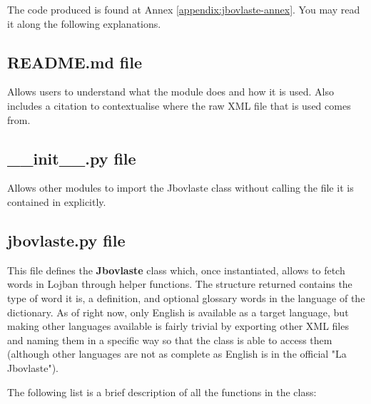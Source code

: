 The code produced is found at Annex \ref{appendix:jbovlaste-annex}. You may read it along the following explanations.

\subsection*{README.md file}

Allows users to understand what the module does and how it is used.
Also includes a citation to contextualise where the raw XML file that is used comes from.

\subsection*{\_\_init\_\_.py file}

Allows other modules to import the Jbovlaste class without calling the file it is contained in explicitly.

\subsection*{jbovlaste.py file}

This file defines the \textbf{Jbovlaste} class which, once instantiated, allows to fetch
words in Lojban through helper functions. The structure returned contains the type of word it is,
a definition, and optional glossary words in the language of the dictionary.
As of right now, only English is available as a target language, but making other
languages available is fairly trivial by exporting other XML files and naming them in a specific
way so that the class is able to access them (although other languages are not as complete as English
is in the official "La Jbovlaste").\newline

The following list is a brief description of all the functions in the class:

